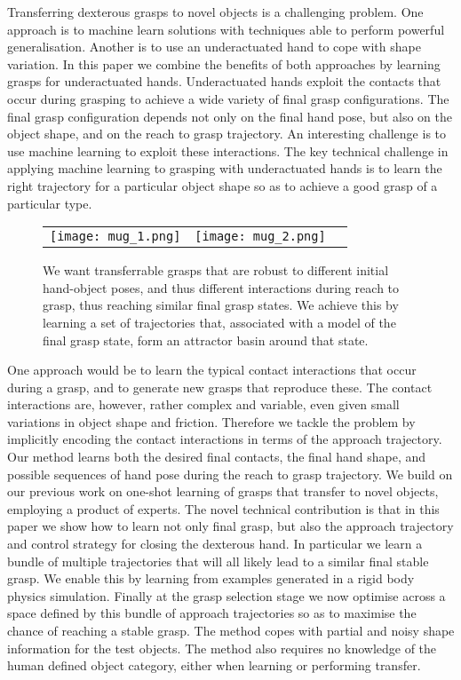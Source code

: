 Transferring dexterous grasps to novel objects is a challenging problem. One approach is to machine learn solutions with techniques able to perform powerful generalisation. Another is to use an underactuated hand to cope with shape variation. In this paper we combine the benefits of both approaches by learning grasps for underactuated hands. Underactuated hands exploit the contacts that occur during grasping to achieve a wide variety of final grasp configurations. The final grasp configuration depends not only on the final hand pose, but also on the object shape, and on the reach to grasp trajectory. An interesting challenge is to use machine learning to exploit these interactions. The key technical challenge in applying machine learning to grasping with underactuated hands is to learn the right trajectory for a particular object shape so as to achieve a good grasp of a particular type. 

\begin{figure}
  \centering
  \begin{tabular}{ccc}
  \texttt{[image: mug\_1.png]} &
  \texttt{[image: mug\_2.png]} \\
  \end{tabular}
 \caption{{We want transferrable grasps that are robust to different initial hand-object poses, and thus different interactions during reach to grasp, thus reaching similar final grasp states. We achieve this by learning a set of trajectories that, associated with a model of the final grasp state, form an attractor basin around that state.}}
  \label{fig:two_grasps}
\end{figure}

One approach would be to learn the typical contact interactions that occur during a grasp, and to generate new grasps that reproduce these. The contact interactions are, however, rather complex and variable, even given small variations in object shape and friction. Therefore we tackle the problem by implicitly encoding the contact interactions in terms of the approach trajectory. Our method learns both the desired final contacts, the final hand shape, and possible sequences of hand pose during the reach to grasp trajectory. We build on our previous work on one-shot learning of grasps that transfer to novel objects, employing a product of experts. The novel technical contribution is that in this paper we show how to learn not only final grasp, but also the approach trajectory and control strategy for closing the dexterous hand. In particular we learn a bundle of multiple trajectories that will all likely lead to a similar final stable grasp. We enable this by learning from examples generated in a rigid body physics simulation. Finally at the grasp selection stage we now optimise across a space defined by this bundle of approach trajectories so as to maximise the chance of reaching a stable grasp. The method copes with partial and noisy shape information for the test objects. The method also requires no knowledge of the human defined object category, either when learning or performing transfer.

